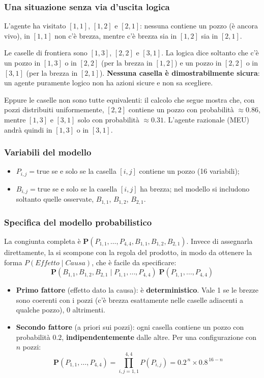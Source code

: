 \documentclass[11pt, a4paper]{article}
\newcommand{\Pv}{\mathbf{P}}               %
\begin{document}
\subsubsection*{Una situazione senza via d'uscita logica}

L'agente ha visitato $[1,1]$, $[1,2]$ e $[2,1]$: nessuna contiene un pozzo (è ancora vivo), in $[1,1]$ non c'è brezza, mentre c'è brezza sia in $[1,2]$ sia in $[2,1]$.

Le caselle di frontiera sono $[1,3]$, $[2,2]$ e $[3,1]$. La logica dice soltanto che c'è un pozzo in $[1,3]$ o in $[2,2]$ (per la brezza in $[1,2]$) e un pozzo in $[2,2]$ o in $[3,1]$ (per la brezza in $[2,1]$). \textbf{Nessuna casella è dimostrabilmente sicura}: un agente puramente logico non ha azioni sicure e non sa scegliere.

Eppure le caselle non sono tutte equivalenti: il calcolo che segue mostra che, con pozzi distribuiti uniformemente, $[2,2]$ contiene un pozzo con probabilità $\approx 0.86$, mentre $[1,3]$ e $[3,1]$ solo con probabilità $\approx 0.31$. L'agente razionale (MEU) andrà quindi in $[1,3]$ o in $[3,1]$.

\subsubsection*{Variabili del modello}

\begin{itemize}
  \item $P_{i,j} = \text{true}$ se e solo se la casella $[i,j]$ contiene un pozzo (16 variabili);
  \item $B_{i,j} = \text{true}$ se e solo se la casella $[i,j]$ ha brezza; nel modello si includono soltanto quelle osservate, $B_{1,1}$, $B_{1,2}$, $B_{2,1}$.
\end{itemize}

\subsubsection*{Specifica del modello probabilistico}

La congiunta completa è $\Pv(P_{1,1}, \dots, P_{4,4}, B_{1,1}, B_{1,2}, B_{2,1})$. Invece di assegnarla direttamente, la si scompone con la regola del prodotto, in modo da ottenere la forma $P(\mathit{Effetto} \mid \mathit{Causa})$, che è facile da specificare:
\[
  \Pv(B_{1,1}, B_{1,2}, B_{2,1} \mid P_{1,1}, \dots, P_{4,4})\;\Pv(P_{1,1}, \dots, P_{4,4})
\]

\begin{itemize}
  \item \textbf{Primo fattore} (effetto dato la causa): è \textbf{deterministico}. Vale 1 se le brezze sono coerenti con i pozzi (c'è brezza esattamente nelle caselle adiacenti a qualche pozzo), 0 altrimenti.
  \item \textbf{Secondo fattore} (a priori sui pozzi): ogni casella contiene un pozzo con probabilità $0.2$, \textbf{indipendentemente} dalle altre. Per una configurazione con $n$ pozzi:
  \[
    \Pv(P_{1,1}, \dots, P_{4,4}) = \prod_{i,j=1,1}^{4,4} P(P_{i,j}) = 0.2^{\,n} \times 0.8^{\,16-n}
  \]
\end{itemize}
\end{document}
